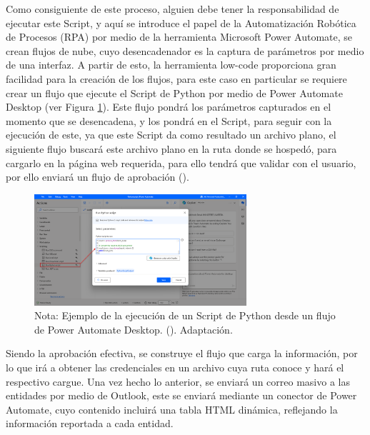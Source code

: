 \documentclass[letter,oneside,12pt,spanish]{report}
\begin{document}
\noindent Como consiguiente de este proceso, alguien debe tener la responsabilidad de ejecutar este Script, y aquí se introduce el papel de la Automatización Robótica de Procesos (RPA) por medio de la herramienta Microsoft Power Automate, se crean flujos de nube, cuyo desencadenador es la captura de parámetros por medio de una interfaz. A partir de esto, la herramienta low-code proporciona gran facilidad para la creación de los flujos, para este caso en particular se requiere crear un flujo que ejecute el Script de Python por medio de Power Automate Desktop (ver Figura \ref{fig:runscript}). Este flujo pondrá los parámetros capturados en el momento que se desencadena, y los pondrá en el Script, para seguir con la ejecución de este, ya que este Script da como resultado un archivo plano, el siguiente flujo buscará este archivo plano en la ruta donde se hospedó, para cargarlo en la página web requerida, para ello tendrá que validar con el usuario, por ello enviará un flujo de aprobación (\cite{stackoverflow2024pythonpowerautomate}).


\begin{figure}[ht]
    \centering
    \includegraphics[width=0.7\textwidth]{Figs/ejecicion script - metodologia.png}
    \label{fig:runscript}
    \\Nota:  Ejemplo de la ejecución de un Script de Python desde un flujo de Power Automate Desktop. (\cite{stackoverflow2024pythonpowerautomate}). Adaptación.
\end{figure}

\noindent Siendo la aprobación efectiva, se construye el flujo que carga la información, por lo que irá a obtener las credenciales en un archivo cuya ruta conoce y hará el respectivo cargue. Una vez hecho lo anterior, se enviará un correo masivo a las entidades por medio de Outlook, este se enviará mediante un conector de Power Automate, cuyo contenido incluirá una tabla HTML dinámica, reflejando la información reportada a cada entidad.
\end{document}
